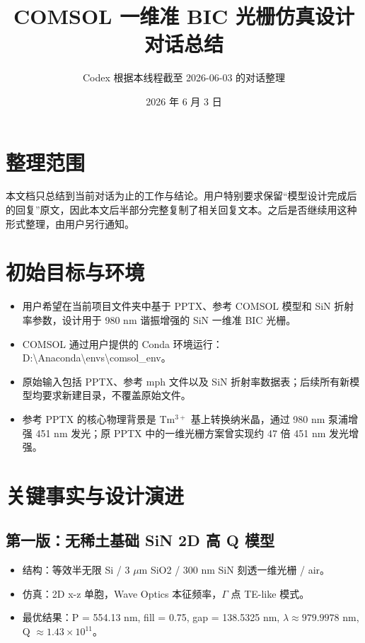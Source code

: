 \documentclass[11pt,a4paper]{ctexart}
\title{COMSOL 一维准 BIC 光栅仿真设计对话总结}
\author{Codex 根据本线程截至 2026-06-03 的对话整理}
\date{2026 年 6 月 3 日}
\begin{document}
\maketitle
\tableofcontents
\newpage

\section{整理范围}
本文档只总结到当前对话为止的工作与结论。用户特别要求保留“模型设计完成后的回复”原文，因此本文后半部分完整复制了相关回复文本。之后是否继续用这种形式整理，由用户另行通知。

\section{初始目标与环境}
\begin{itemize}
  \item 用户希望在当前项目文件夹中基于 PPTX、参考 COMSOL 模型和 SiN 折射率参数，设计用于 980 nm 谐振增强的 SiN 一维准 BIC 光栅。
  \item COMSOL 通过用户提供的 Conda 环境运行：D:\textbackslash Anaconda\textbackslash envs\textbackslash comsol\_env。
  \item 原始输入包括 PPTX、参考 mph 文件以及 SiN 折射率数据表；后续所有新模型均要求新建目录，不覆盖原始文件。
  \item 参考 PPTX 的核心物理背景是 Tm$^{3+}$ 基上转换纳米晶，通过 980 nm 泵浦增强 451 nm 发光；原 PPTX 中的一维光栅方案曾实现约 47 倍 451 nm 发光增强。
\end{itemize}

\section{关键事实与设计演进}
\subsection{第一版：无稀土基础 SiN 2D 高 Q 模型}
\begin{itemize}
  \item 结构：等效半无限 Si / 3 $\mu$m SiO2 / 300 nm SiN 刻透一维光栅 / air。
  \item 仿真：2D x-z 单胞，Wave Optics 本征频率，$\Gamma$ 点 TE-like 模式。
  \item 最优结果：P = 554.13 nm, fill = 0.75, gap = 138.5325 nm, $\lambda \approx 979.9978$ nm, Q $\approx 1.43\times10^{11}$。
\end{itemize}
\end{document}
